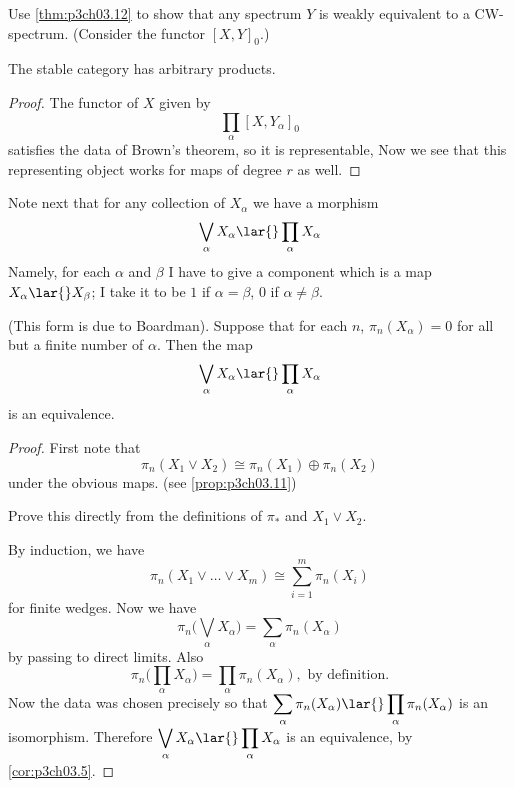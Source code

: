 \documentclass[../main]{subfiles}
\begin{document}
\begin{exercise}
Use \ref{thm:p3ch03.12} to show that any spectrum $Y$ is weakly equivalent to a CW-spectrum. (Consider the functor $[X,Y]_0$.)
\end{exercise}
\begin{customprop}{3.13}\label{prop:p3ch03.13}
The stable category has arbitrary products.
\end{customprop}
\begin{proof}
The functor of $X$ given by \[\prod_\alpha [X,Y_\alpha]_0 \] satisfies the data of Brown's theorem, so it is representable, Now we
see that this representing object works for maps of degree $r$ as well.
\end{proof}

Note next that for any collection of $X_\alpha$ we have a morphism \[\bigvee_\alpha X_\alpha \lar{} \prod_\alpha X_\alpha\]
Namely, for each $\alpha$ and $\beta$ I have to give a component which is a map $X_\alpha \lar{} X_\beta$; I take it to be $1$ if $\alpha=\beta$, $0$ if $\alpha\neq \beta$.

\begin{customprop}{3.14}\label{prop:p3ch03.14}
(This form is due to Boardman). Suppose that for each $n$, $\pi_n(X_\alpha) =0$ for all but a finite number of $\alpha$. Then the map  \[\bigvee_\alpha X_\alpha \lar{} \prod_\alpha X_\alpha\]
is an equivalence.
\end{customprop}
\begin{proof}
First note that \[\pi_n(X_1\vee X_2) \cong \pi_n(X_1)\oplus \pi_n(X_2)\]
under the obvious maps. (see \ref{prop:p3ch03.11}) \begin{exercise}
Prove this directly from the definitions of $\pi_\ast$ and $X_1\vee X_2$.
\end{exercise}
By induction, we have \[\pi_n(X_1\vee \dots \vee X_m) \cong \sum_{i=1}^m \pi_n(X_i) \]
for finite wedges. Now we have \[\pi_n\bigg(\bigvee_\alpha X_\alpha\bigg) = \sum_\alpha \pi_n(X_\alpha)\]
by passing to direct limits. Also \[\pi_n\bigg(\prod_\alpha X_\alpha\bigg)= \prod_\alpha \pi_n (X_\alpha), \text{ by definition.} \]
Now the data was chosen precisely so that $\displaystyle \sum_\alpha \pi_n (X_\alpha) \lar{} \prod_\alpha \pi_n(X_\alpha) $ is an isomorphism. Therefore $\displaystyle \bigvee_\alpha X_\alpha \lar{} \prod_\alpha X_\alpha$ is an equivalence, by \ref{cor:p3ch03.5}.
\end{proof}
\end{document}
